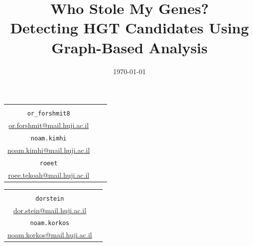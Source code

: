 \documentclass[11pt]{article}
\title{\textbf{Who Stole My Genes?}\\Detecting HGT Candidates Using Graph-Based Analysis}
\author{}
\date{}
\begin{document}
	\maketitle
	\vspace{-50pt}
	
	\begin{center}
		\renewcommand{\arraystretch}{1.15}
		\setlength{\tabcolsep}{10pt}
		
		\begin{tabular}{ccc}
			\begin{minipage}[t]{0.30\textwidth}\centering
				\textbf{Or Forshmit}\\[-1pt]
				\footnotesize\texttt{or\_forshmit8}\\[-1pt]
				\footnotesize\url{or.forshmit@mail.huji.ac.il}
			\end{minipage}
			&
			\begin{minipage}[t]{0.30\textwidth}\centering
				\textbf{Noam Kimhi}\\[-1pt]
				\footnotesize\texttt{noam.kimhi}\\[-1pt]
				\footnotesize\url{noam.kimhi@mail.huji.ac.il}
			\end{minipage}
			&
			\begin{minipage}[t]{0.30\textwidth}\centering
				\textbf{Roee Tekoah}\\[-1pt]
				\footnotesize\texttt{roeet}\\[-1pt]
				\footnotesize\url{roee.tekoah@mail.huji.ac.il}
			\end{minipage}
		\end{tabular}
		
		\vspace{10pt}
		
		\begin{tabular}{cc}
			\begin{minipage}[t]{0.30\textwidth}\centering
				\textbf{Dor Stein}\\[-1pt]
				\footnotesize\texttt{dorstein}\\[-1pt]
				\footnotesize\url{dor.stein@mail.huji.ac.il}
			\end{minipage}
			&
			\begin{minipage}[t]{0.30\textwidth}\centering
				\textbf{Noam Korkos}\\[-1pt]
				\footnotesize\texttt{noam.korkos}\\[-1pt]
				\footnotesize\url{noam.korkos@mail.huji.ac.il}
			\end{minipage}
		\end{tabular}
		
		\vspace{20pt}
		
		\href{https://github.com/noam-kimhi/Who-Stole-My-Genes/}
		{\Large \faGithub} \\[5pt]
		\date{\today}
	\end{center}
	
\end{document}
